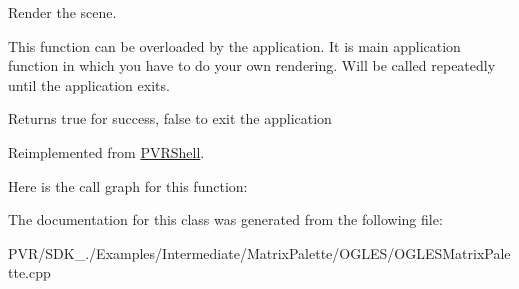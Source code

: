Render the scene. 





This function can be overloaded by the application. It is main application function in which you have to do your own rendering. Will be called repeatedly until the application exits. \begin{DoxyReturn}{Returns}
true for success, false to exit the application 
\end{DoxyReturn}


Reimplemented from \hyperlink{class_p_v_r_shell_ae0eb5f797cbe993a22b8659f9c332578}{P\+V\+R\+Shell}.



Here is the call graph for this function\+:




The documentation for this class was generated from the following file\+:\begin{DoxyCompactItemize}
\item 
P\+V\+R/\+S\+D\+K\+\_./\+Examples/\+Intermediate/\+Matrix\+Palette/\+O\+G\+L\+E\+S/O\+G\+L\+E\+S\+Matrix\+Palette.\+cpp\end{DoxyCompactItemize}
